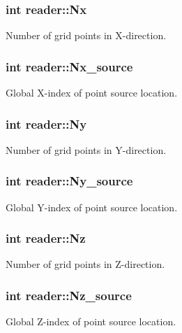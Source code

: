 \subsubsection[{\texorpdfstring{Nx}{Nx}}]{\setlength{\rightskip}{0pt plus 5cm}int reader\+::\+Nx}\hypertarget{classreader_a358575a5554cef675bc5846e68b4fe19}{}\label{classreader_a358575a5554cef675bc5846e68b4fe19}
Number of grid points in X-\/direction. 
\subsubsection[{\texorpdfstring{Nx\+\_\+source}{Nx_source}}]{\setlength{\rightskip}{0pt plus 5cm}int reader\+::\+Nx\+\_\+source}\hypertarget{classreader_a68877887a99638c9df7733ac89abd562}{}\label{classreader_a68877887a99638c9df7733ac89abd562}
Global X-\/index of point source location. 
\subsubsection[{\texorpdfstring{Ny}{Ny}}]{\setlength{\rightskip}{0pt plus 5cm}int reader\+::\+Ny}\hypertarget{classreader_adbd1ed384f30c9dea7734fdf0e83e0a2}{}\label{classreader_adbd1ed384f30c9dea7734fdf0e83e0a2}
Number of grid points in Y-\/direction. 
\subsubsection[{\texorpdfstring{Ny\+\_\+source}{Ny_source}}]{\setlength{\rightskip}{0pt plus 5cm}int reader\+::\+Ny\+\_\+source}\hypertarget{classreader_a81c46fb2596e303dfd0ffa1ce51637c1}{}\label{classreader_a81c46fb2596e303dfd0ffa1ce51637c1}
Global Y-\/index of point source location. 
\subsubsection[{\texorpdfstring{Nz}{Nz}}]{\setlength{\rightskip}{0pt plus 5cm}int reader\+::\+Nz}\hypertarget{classreader_a87dde1a2d482102671811dd837ddd3b8}{}\label{classreader_a87dde1a2d482102671811dd837ddd3b8}
Number of grid points in Z-\/direction. 
\subsubsection[{\texorpdfstring{Nz\+\_\+source}{Nz_source}}]{\setlength{\rightskip}{0pt plus 5cm}int reader\+::\+Nz\+\_\+source}\hypertarget{classreader_a753e712b646921cef7bf3260804eca41}{}\label{classreader_a753e712b646921cef7bf3260804eca41}
Global Z-\/index of point source location. 
